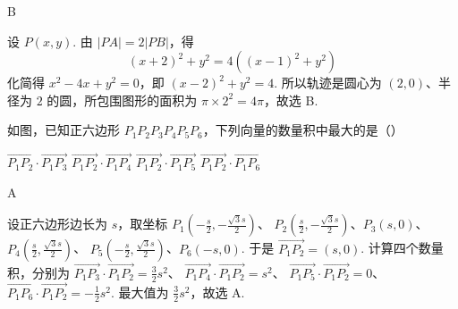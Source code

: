 \begin{answer}
B
\end{answer}

\begin{solution}
设 \(P(x,y)\). 由 \(|PA|=2|PB|\)，得
\[
(x+2)^2+y^2=4\left((x-1)^2+y^2\right)
\]
化简得 \(x^2-4x+y^2=0\)，即 \((x-2)^2+y^2=4\). 所以轨迹是圆心为 \((2,0)\)、半径为 \(2\) 的圆，所包围图形的面积为 \(\pi\times2^2=4\pi\)，故选 B.
\end{solution}

\begin{problem}
如图，已知正六边形 \(P_{1}P_{2}P_{3}P_{4}P_{5}P_{6}\)，下列向量的数量积中最大的是（\quad）


\choices
    {\(\overrightarrow{P_1P_2} \cdot \overrightarrow{P_1P_3}\)}
    {\(\overrightarrow{P_1P_2} \cdot \overrightarrow{P_1P_4}\)}
    {\(\overrightarrow{P_1P_2} \cdot \overrightarrow{P_1P_5}\)}
    {\(\overrightarrow{P_1P_2} \cdot \overrightarrow{P_1P_6}\)}
\end{problem}

\begin{answer}
A
\end{answer}

\begin{solution}
设正六边形边长为 \(s\)，取坐标
\(P_1\left(-\frac{s}{2},-\frac{\sqrt{3}s}{2}\right)\)、
\(P_2\left(\frac{s}{2},-\frac{\sqrt{3}s}{2}\right)\)、\(P_3(s,0)\)、
\(P_4\left(\frac{s}{2},\frac{\sqrt{3}s}{2}\right)\)、
\(P_5\left(-\frac{s}{2},\frac{\sqrt{3}s}{2}\right)\)、\(P_6(-s,0)\). 于是 \(\overrightarrow{P_1P_2}=(s,0)\).
计算四个数量积，分别为
\(\overrightarrow{P_1P_3}\cdot\overrightarrow{P_1P_2}=\frac{3}{2}s^2\)、
\(\overrightarrow{P_1P_4}\cdot\overrightarrow{P_1P_2}=s^2\)、
\(\overrightarrow{P_1P_5}\cdot\overrightarrow{P_1P_2}=0\)、
\(\overrightarrow{P_1P_6}\cdot\overrightarrow{P_1P_2}=-\frac{1}{2}s^2\).
最大值为 \(\frac{3}{2}s^2\)，故选 A.
\end{solution}

